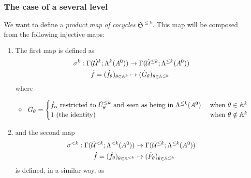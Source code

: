 \subsubsection{The case of a several level}
\begin{comment}
  \cite[II.3.3]{Loday1994}
\end{comment}
\begin{defn}
  We want to define a \emph{product map of cocycles} $\mathfrak{S}^{\leq k}$.
  This map will be composed from the following injective maps:
  \begin{enumerate}
    \item The first map is defined as
      \begin{align*}
        \sigma^k:\Gamma(\dot{\mathcal{U}}^k;\Lambda^k(A^0))
        &\to \Gamma(\dot{\mathcal{U}}^{\leq k};\Lambda^{\leq k}(A^0))
      \\\dot f=(\dot f_\theta)_{\theta\in\mathbb{A}^k}
        &\mapsto (\dot G_\theta)_{\theta\in\mathbb{A}^{\leq k}}
      \end{align*}
      where
      \begin{itemize}
        \item $\dot G_\theta=\begin{cases}
            \dot f_\alpha \text{~restricted to } \dot U_\theta^{\leq k}
            \text{~and seen as being in } \Lambda^{\leq k}(A^0)
            & \text{~when } \theta\in\mathbb{A}^k
          \\1 \text{~(the identity) }
            & \text{~when } \theta\notin\mathbb{A}^k
          \end{cases}$
      \end{itemize}
    \item and the second map
      \begin{align*}
        \sigma^{<k}:\Gamma(\dot{\mathcal{U}}^{<k};\Lambda^{<k}(A^0))
        &\to \Gamma(\dot{\mathcal{U}}^{\leq k};\Lambda^{\leq k}(A^0))
      \\\dot f=(\dot f_\theta)_{\theta\in\mathbb{A}^{<k}}
        &\mapsto (\dot F_\theta)_{\theta\in\mathbb{A}^{\leq k}}
      \end{align*}
      is defined, in a similar way, as
\end{enumerate}
\end{defn}
